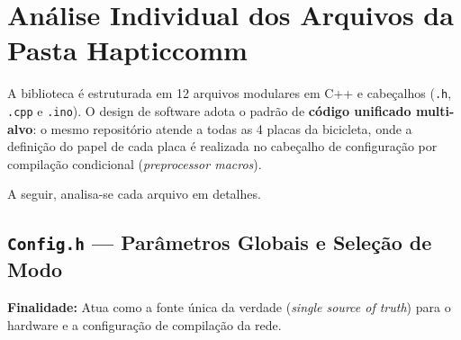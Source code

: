 \documentclass[12pt,a4paper]{article}
\begin{document}
\newpage
\section{Análise Individual dos Arquivos da Pasta Hapticcomm}

A biblioteca é estruturada em 12 arquivos modulares em C++ e cabeçalhos (\texttt{.h}, \texttt{.cpp} e \texttt{.ino}). O design de software adota o padrão de \textbf{código unificado multi-alvo}: o mesmo repositório atende a todas as 4 placas da bicicleta, onde a definição do papel de cada placa é realizada no cabeçalho de configuração por compilação condicional (\textit{preprocessor macros}).

A seguir, analisa-se cada arquivo em detalhes.

\subsection{\texttt{Config.h} --- Parâmetros Globais e Seleção de Modo}
\textbf{Finalidade:} Atua como a fonte única da verdade (\textit{single source of truth}) para o hardware e a configuração de compilação da rede.
\end{document}
